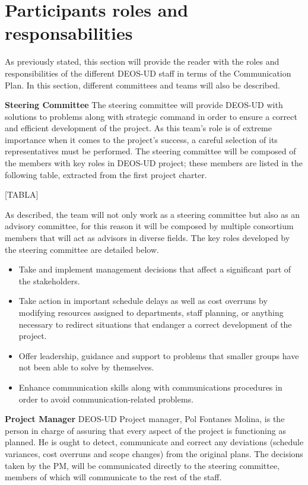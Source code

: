 \section{Participants roles and responsabilities}
As previously stated, this section will provide the reader with the roles and responsibilities of the different DEOS-UD staff in terms of the Communication Plan. In this section, different committees and teams will also be described. 

\textbf{Steering Committee}
\newline
\newline
The steering committee will provide DEOS-UD with solutions to problems along with strategic command in order to ensure a correct and efficient development of the project. As this team’s role is of extreme importance when it comes to the project’s success, a careful selection of its representatives must be performed. The steering committee will be composed of the members with key roles in DEOS-UD project; these members are listed in the following table, extracted from the first project charter. 

[TABLA]



As described, the team will not only work as a steering committee but also as an advisory committee, for this reason it will be composed by multiple consortium members that will act as advisors in diverse fields. 
The key roles developed by the steering committee are detailed below. 
 \begin{itemize}
 	\item	Take and implement management decisions that affect a significant part of the stakeholders. 
 	\item	Take action in important schedule delays as well as cost overruns by modifying resources assigned to departments, staff planning, or anything necessary to redirect situations that endanger a correct development of the project.
 	\item 	Offer leadership, guidance and support to problems that smaller groups have not been able to solve by themselves. 
 	\item Enhance communication skills along with communications procedures in order to avoid communication-related problems.
 \end{itemize}

\textbf{Project Manager}
\newline
\newline
DEOS-UD Project manager, Pol Fontanes Molina, is the person in charge of assuring that every aspect of the project is functioning as planned. He is ought to detect, communicate and correct any deviations (schedule variances, cost overruns and scope changes) from the original plans. The decisions taken by the PM, will be communicated directly to the steering committee, members of which will communicate to the rest of the staff.

